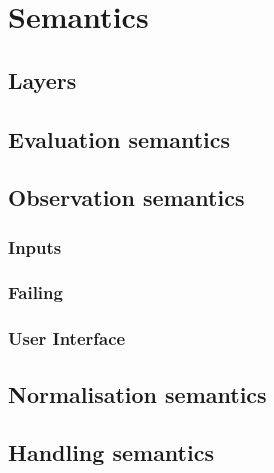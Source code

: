 
\section{Semantics}

  \subsection{Layers}

  \subsection{Evaluation semantics}

  \subsection{Observation semantics}
    \subsubsection{Inputs}
    \subsubsection{Failing}
    \subsubsection{User Interface }

  \subsection{Normalisation semantics}

  \subsection{Handling semantics}
